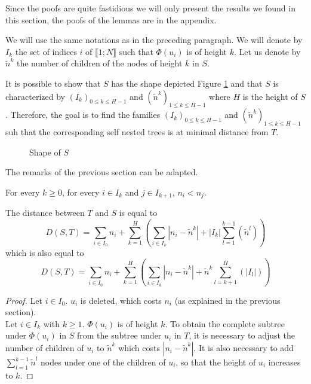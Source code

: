Since the poofs are quite fastidious we will only present the results
we found in this section, the poofs of the lemmas are in the appendix.

We will use the same notations as in the preceding paragraph. We will
denote by $I_{k}$ the set of indices $i$ of
$\llbracket 1;N \rrbracket$ such that $\Phi(u_{i})$ is of height
$k$. Let us denote by $\tilde{n}^{k}$ the number of children of the
nodes of height $k$ in $S$.

It is possible to show that $S$ has the shape depicted Figure
\ref{fig:shape_NST_2} %
and that $S$ is characterized by
$(I_{k})_{0 \leqslant k \leqslant H-1}$ and
$(\tilde{n}^{k})_{1 \leqslant k \leqslant H-1}$ where $H$ is the
height of $S$. Therefore, the goal is to find the families
$(I_{k})_{0 \leqslant k \leqslant H-1}$ and
$(\tilde{n}^{k})_{1 \leqslant k \leqslant H-1}$ suh that the
corresponding self nested trees is at minimal distance from $T$.
\begin{figure}
  \centering
  
  \caption{Shape of $S$}
  \label{fig:shape_NST_2}
\end{figure}
The remarks of the previous section can be adapted.

\begin{lem}
  \label{lem:increasn}
  For every $k \geqslant 0$, for every $i \in I_{k}$ and $j \in
  I_{k+1}$, $n_{i} < n_{j}$.
\end{lem}

\begin{lem}
 The distance between $T$ and $S$ is equal to 
 $$ D(S,T) = \sum_{i \in I_{0}} n_{i} + \sum_{k = 1}^{H} \left(
   \sum_{i \in I_{k}} |n_{i} - \tilde{n}^{k}| + |I_{k}|\sum_{l =
     1}^{k-1}(\tilde{n}^{l}) \right)$$ 
 which is also equal to 
 $$ D(S,T) = \sum_{i \in I_{0}} n_{i} + \sum_{k = 1}^{H} \left(
   \sum_{i \in I_{k}} |n_{i} - \tilde{n}^{k}| + \tilde{n}^{k}\sum_{l =
     k+1}^{H}(|I_{l}|) \right)$$
 \begin{proof}
   Let $i \in I_{0}$. $u_{i}$ is deleted, which costs $n_{i}$ (as
   explained in the previous section).\\
   Let $i \in I_{k}$ with $k \geqslant 1$. $\Phi(u_{i})$ is of height
   $k$. To obtain the complete subtree under $\Phi(u_{i})$ in $S$ from
   the subtree under $u_{i}$ in $T$, it is necessary to adjust the
   number of children of $u_{i}$ to $\tilde{n}^{k}$ which costs
   $\left| n_{i} - \tilde{n}^{k} \right|$. It is also necessary to add
   $\sum_{l = 1}^{k-1}\tilde{n}^{l}$ nodes under one of the children
   of $u_{i}$, so that the height of $u_{i}$ increases to $k$.
   \end{proof}
\end{lem}

